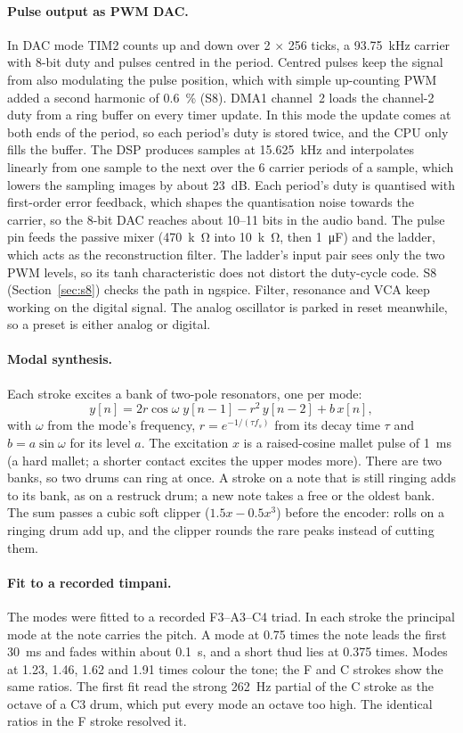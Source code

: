 \documentclass[11pt,a4paper]{article}
\begin{document}
\paragraph{Pulse output as PWM DAC.} In DAC mode TIM2 counts up and down over 2 $\times$ 256 ticks, a
\SI{93.75}{kHz} carrier with 8-bit duty and pulses centred in the period. Centred pulses keep the signal from
also modulating the pulse position, which with simple up-counting PWM added a second harmonic of
\SI{0.6}{\percent} (S8). DMA1 channel~2 loads the channel-2 duty from a ring buffer on every timer update. In
this mode the update comes at both ends of the period, so each period's duty is stored twice, and the CPU
only fills the buffer. The DSP produces samples at \SI{15.625}{kHz} and interpolates linearly from one
sample to the next over the 6 carrier periods of a sample, which lowers the sampling images by about
\SI{23}{dB}. Each period's duty is quantised with first-order error feedback, which shapes the quantisation
noise towards the carrier, so the 8-bit DAC reaches about 10--11 bits in the audio band. The pulse pin feeds
the passive
mixer (\SI{470}{k\ohm} into \SI{10}{k\ohm}, then \SI{1}{\micro F}) and the ladder, which acts as the
reconstruction filter. The ladder's input pair sees only the two PWM levels, so its tanh characteristic does
not distort the duty-cycle code. S8 (Section~\ref{sec:s8}) checks the path in ngspice. Filter, resonance and
VCA keep working on the digital signal. The analog oscillator is parked in reset meanwhile, so a preset is
either analog or digital.

\paragraph{Modal synthesis.} Each stroke excites a bank of two-pole resonators, one per mode:
\[
  y[n] = 2r\cos\omega\; y[n-1] - r^2\, y[n-2] + b\, x[n],
\]
with $\omega$ from the mode's frequency, $r = e^{-1/(\tau f_s)}$ from its decay time $\tau$ and
$b = a\sin\omega$ for its level $a$. The excitation $x$ is a
raised-cosine mallet pulse of \SI{1}{ms} (a hard mallet; a shorter contact excites the upper modes more).
There are two banks, so two drums can ring at once. A stroke on a note that is still ringing adds to its bank,
as on a restruck drum; a new note takes a free or the oldest bank. The sum passes a cubic soft clipper
($1.5x - 0.5x^3$) before the encoder: rolls on a ringing drum add up, and the clipper rounds the rare peaks
instead of cutting them.

\paragraph{Fit to a recorded timpani.} The modes were fitted to a recorded F3--A3--C4 triad. In each stroke
the principal mode at the note carries the pitch. A mode at 0.75 times the note leads the first
\SI{30}{ms} and fades within about \SI{0.1}{s}, and a short thud lies at 0.375 times. Modes at 1.23, 1.46,
1.62 and 1.91 times colour the tone; the F and C strokes show the same ratios. The first fit read the strong
\SI{262}{Hz} partial of the C stroke as the octave of a C3 drum, which put every mode an octave too high.
The identical ratios in the F stroke resolved it.
\end{document}
